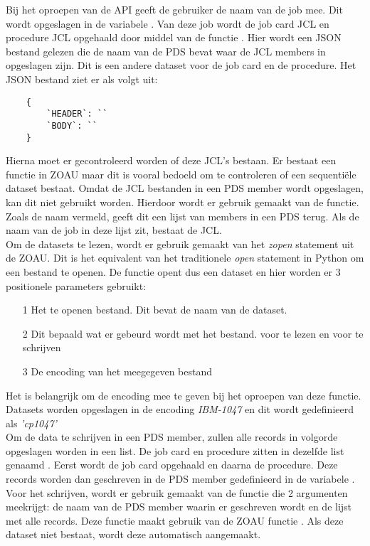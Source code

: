 \vspace{5 mm}
Bij het oproepen van de API geeft de gebruiker de naam van de job mee. Dit wordt opgeslagen in de variabele . Van deze job wordt de job card JCL en procedure JCL opgehaald door middel van de functie . Hier wordt een JSON bestand gelezen die de naam van de PDS bevat waar de JCL members in opgeslagen zijn. Dit is een andere dataset voor de job card en de procedure. Het JSON bestand ziet er als volgt uit: \\

\begin{lstlisting}
    {
        `HEADER`: ``
        `BODY`: ``
    }
\end{lstlisting}

Hierna moet er gecontroleerd worden of deze JCL's bestaan. Er bestaat een  functie in ZOAU maar dit is vooral bedoeld om te controleren of een sequentiële dataset bestaat. Omdat de JCL bestanden in een PDS member wordt opgeslagen, kan dit niet gebruikt worden. Hierdoor wordt er gebruik gemaakt van de  functie. Zoals de naam vermeld, geeft dit een lijst van members in een PDS terug. Als de naam van de job in deze lijst zit, bestaat de JCL. \\
 
Om de datasets te lezen, wordt er gebruik gemaakt van het \textit{zopen} statement uit de ZOAU. Dit is het equivalent van het traditionele \textit{open} statement in Python om een bestand te openen. De  functie opent dus een dataset en hier worden er 3 positionele parameters gebruikt: 
\begin{itemize}
    \item[1] Het te openen bestand. Dit bevat de naam van de dataset.
    \item[2] Dit bepaald wat er gebeurd wordt met het bestand. \textit{} voor te lezen en \textit{} voor te schrijven
    \item[3] De encoding van het meegegeven bestand
\end{itemize} 
Het is belangrijk om de encoding mee te geven bij het oproepen van deze functie. Datasets worden opgeslagen in de encoding \textit{IBM-1047} en dit wordt gedefinieerd als \textit{'cp1047'} \\

Om de data te schrijven in een PDS member, zullen alle records in volgorde opgeslagen worden in een list. De job card en procedure zitten in dezelfde list genaamd . Eerst wordt de job card opgehaald en daarna de procedure. Deze records worden dan geschreven in de PDS member gedefinieerd in de variabele . Voor het schrijven, wordt er gebruik gemaakt van de functie  die 2 argumenten meekrijgt: de naam van de PDS member waarin er geschreven wordt en de lijst met alle records. Deze functie maakt gebruik van de ZOAU functie . Als deze dataset niet bestaat, wordt deze automatisch aangemaakt.


